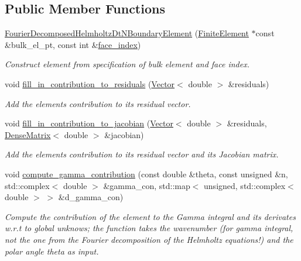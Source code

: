 \subsection*{Public Member Functions}
\begin{DoxyCompactItemize}
\item 
\hyperlink{classoomph_1_1FourierDecomposedHelmholtzDtNBoundaryElement_a248410954051f22d292126e70ca2f889}{Fourier\+Decomposed\+Helmholtz\+Dt\+N\+Boundary\+Element} (\hyperlink{classoomph_1_1FiniteElement}{Finite\+Element} $\ast$const \&bulk\+\_\+el\+\_\+pt, const int \&\hyperlink{classoomph_1_1FaceElement_a478d577ac6db67ecc80f1f02ae3ab170}{face\+\_\+index})
\begin{DoxyCompactList}\small\item\em Construct element from specification of bulk element and face index. \end{DoxyCompactList}\item 
void \hyperlink{classoomph_1_1FourierDecomposedHelmholtzDtNBoundaryElement_a7cc11232d6c849efc10bc683d047126c}{fill\+\_\+in\+\_\+contribution\+\_\+to\+\_\+residuals} (\hyperlink{classoomph_1_1Vector}{Vector}$<$ double $>$ \&residuals)
\begin{DoxyCompactList}\small\item\em Add the element\textquotesingle{}s contribution to its residual vector. \end{DoxyCompactList}\item 
void \hyperlink{classoomph_1_1FourierDecomposedHelmholtzDtNBoundaryElement_a05f4242ac8ee12f5a765bf7eff896e60}{fill\+\_\+in\+\_\+contribution\+\_\+to\+\_\+jacobian} (\hyperlink{classoomph_1_1Vector}{Vector}$<$ double $>$ \&residuals, \hyperlink{classoomph_1_1DenseMatrix}{Dense\+Matrix}$<$ double $>$ \&jacobian)
\begin{DoxyCompactList}\small\item\em Add the element\textquotesingle{}s contribution to its residual vector and its Jacobian matrix. \end{DoxyCompactList}\item 
void \hyperlink{classoomph_1_1FourierDecomposedHelmholtzDtNBoundaryElement_aeabcecba445cac4bc31ef5133f87ce08}{compute\+\_\+gamma\+\_\+contribution} (const double \&theta, const unsigned \&n, std\+::complex$<$ double $>$ \&gamma\+\_\+con, std\+::map$<$ unsigned, std\+::complex$<$ double $>$ $>$ \&d\+\_\+gamma\+\_\+con)
\begin{DoxyCompactList}\small\item\em Compute the contribution of the element to the Gamma integral and its derivates w.\+r.\+t to global unknows; the function takes the wavenumber (for gamma integral, not the one from the Fourier decomposition of the Helmholtz equations!) and the polar angle theta as input. \end{DoxyCompactList}\item 

\end{DoxyCompactItemize}
